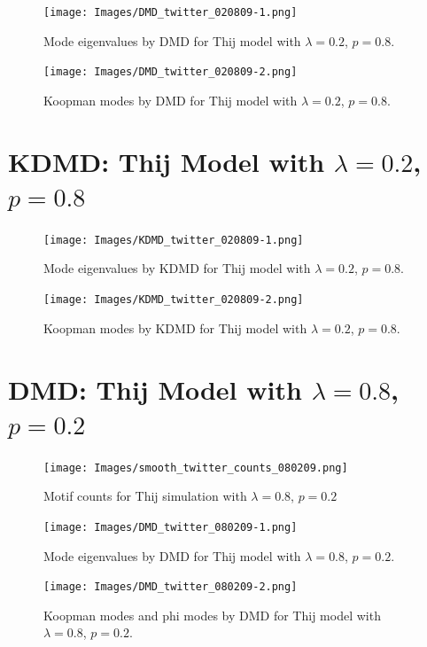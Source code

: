 \clearpage
\begin{figure}
    \texttt{[image: Images/DMD\_twitter\_020809-1.png]}
    \centering
    \caption{Mode eigenvalues by DMD for Thij model
    with $\lambda=0.2$, $p=0.8$.}
    \label{fig:dmd02081}
\end{figure}

\begin{figure}
    \texttt{[image: Images/DMD\_twitter\_020809-2.png]}
    \centering
    \caption{Koopman modes by DMD for Thij model
    with $\lambda=0.2$, $p=0.8$.}
    \label{fig:dmd02082}
\end{figure}

\clearpage
\section{KDMD: Thij Model with $\lambda=0.2$, $p=0.8$}


\begin{figure}
    \texttt{[image: Images/KDMD\_twitter\_020809-1.png]}
    \centering
    \caption{Mode eigenvalues by KDMD for Thij model
    with $\lambda=0.2$, $p=0.8$.}
    \label{fig:kdmd02083}
\end{figure}

\begin{figure}
    \texttt{[image: Images/KDMD\_twitter\_020809-2.png]}
    \centering
    \caption{ Koopman modes by KDMD for Thij model
    with $\lambda=0.2$, $p=0.8$.}
    \label{fig:kdmd02084}
\end{figure}

\FloatBarrier

\clearpage

\section{DMD: Thij Model with $\lambda=0.8$, $p=0.2$}
\begin{figure}
    \texttt{[image: Images/smooth\_twitter\_counts\_080209.png]}
    \centering
    \caption{Motif counts for Thij simulation with $\lambda=0.8$, $p=0.2$}
    \label{fig:pthij0802}
\end{figure}

\clearpage
\begin{figure}
    \texttt{[image: Images/DMD\_twitter\_080209-1.png]}
    \centering
    \caption{Mode eigenvalues by DMD for Thij model
    with $\lambda=0.8$, $p=0.2$.}
\end{figure}

\begin{figure}
    \texttt{[image: Images/DMD\_twitter\_080209-2.png]}
    \centering
    \caption{Koopman modes and phi modes by DMD for Thij model
    with $\lambda=0.8$, $p=0.2$.}
\end{figure}


